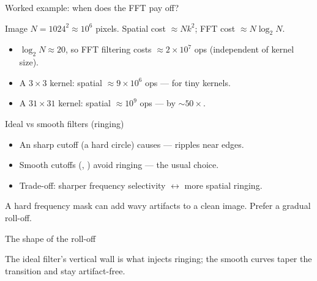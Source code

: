 \documentclass[10pt,aspectratio=169]{beamer}
\begin{document}
\begin{frame}{Worked example: when does the FFT pay off?}
  \begin{mathbox}
    Image $N = 1024^2 \approx 10^6$ pixels. Spatial cost $\approx N k^2$; FFT cost $\approx N\log_2 N$.
  \end{mathbox}
  \begin{itemize}
    \item $\log_2 N \approx 20$, so FFT filtering costs $\approx 2\times 10^7$ ops (independent of kernel size).
    \item A $3\times3$ kernel: spatial $\approx 9\times10^6$ ops —  for tiny kernels.
    \item A $31\times31$ kernel: spatial $\approx 10^9$ ops —  by $\sim 50\times$.
  \end{itemize}
\end{frame}

\begin{frame}{Ideal vs smooth filters (ringing)}
  \begin{itemize}
    \item An  sharp cutoff (a hard circle) causes  — ripples near edges.
    \item Smooth cutoffs (, ) avoid ringing — the usual choice.
    \item Trade-off: sharper frequency selectivity $\leftrightarrow$ more spatial ringing.
  \end{itemize}
  \begin{badbox}
    A hard frequency mask can add wavy artifacts to a clean image. Prefer a gradual roll-off.
  \end{badbox}
\end{frame}

\begin{frame}{The shape of the roll-off}
  \begin{center}
  \end{center}
  The ideal filter's vertical wall is what injects ringing; the smooth curves taper the transition
  and stay artifact-free.
\end{frame}
\end{document}
